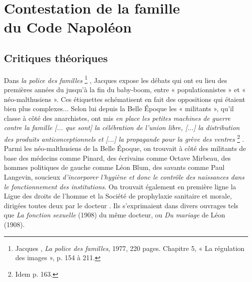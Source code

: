 

\chapter[Contestation de la famille du Code Napoléon]{Contestation de la famille\\du Code Napoléon}


\section{Critiques théoriques}

 Dans \emph{la police des familles}%
\footnote{Jacques , \emph{La police des familles}, 1977, 220 pages. Chapitre 5, « La régulation des images », p. 154 à 211.}%
, Jacques  expose les débats qui ont eu lieu des premières années du  jusqu'à la fin du baby-boom, entre « populationnistes » et « néo-malthusiens ». Ces étiquettes schématisent en fait des oppositions qui étaient bien plus complexes... Selon lui depuis la Belle Époque les « militants », qu'il classe à côté des anarchistes, ont mis {\emph{en place les petites machines de guerre contre la famille \emph{[... que sont]} la célébration de l'union libre, \emph{[...]} la distribution des produits anticonceptionnels et \emph{[...]} la propagande pour la grève des ventres}%
\footnote{Idem p. 163.}%
}. Parmi les néo-malthusiens de la Belle Époque, on trouvait à côté des militants de base des médecins comme Pinard, des écrivains comme Octave Mirbeau, des hommes politiques de gauche comme Léon Blum, des savants comme Paul Langevin, soucieux {\emph{d'incorporer l'hygiène et donc le contrôle des naissances dans le fonctionnement des institutions}}. On trouvait également en première ligne la Ligue des droits de l'homme et la Société de prophylaxie sanitaire et morale, dirigées toutes deux par le docteur . Ils s'exprimaient dans divers ouvrages tels que \emph{La fonction sexuelle} (1908) du même docteur, ou \emph{Du mariage} de Léon  (1908). 


